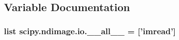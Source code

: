 \subsection{Variable Documentation}
\hypertarget{namespacescipy_1_1ndimage_1_1io_ab5718904384c9b34acd6d31b2e9e6d66}{}
\subsubsection[{\+\_\+\+\_\+all\+\_\+\+\_\+}]{\setlength{\rightskip}{0pt plus 5cm}list scipy.\+ndimage.\+io.\+\_\+\+\_\+all\+\_\+\+\_\+ = \mbox{[}'{\bf imread}'\mbox{]}}\label{namespacescipy_1_1ndimage_1_1io_ab5718904384c9b34acd6d31b2e9e6d66}
